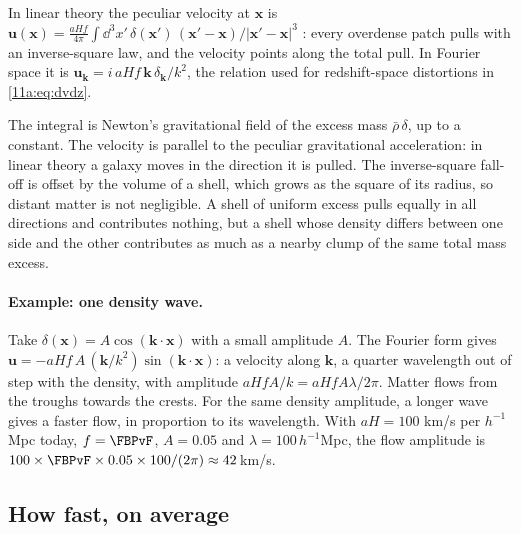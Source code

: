 \begin{keyidea}
In linear theory the peculiar velocity at $\bm x$ is
$\bm u(\bm x)=\frac{aHf}{4\pi}\int\dd^3x'\,\delta(\bm x')\,(\bm x'-\bm x)/|\bm x'-\bm x|^3$
\cite{Kaiser1987,Peebles1993}: every overdense patch pulls with an inverse-square
law, and the velocity points along the total pull. In Fourier space it is
$\bm u_{\bm k}=i\,aHf\,\bm k\,\delta_{\bm k}/k^2$, the relation used for redshift-space
distortions in \eqref{11a:eq:dvdz}.
\end{keyidea}

The integral is Newton's gravitational field of the excess mass $\bar\rho\,\delta$,
up to a constant. The velocity is parallel to the peculiar gravitational
acceleration: in linear theory a galaxy moves in the direction it is pulled. The
inverse-square fall-off is offset by the volume of a shell, which grows as the
square of its radius, so distant matter is not negligible. A shell of uniform
excess pulls equally in all directions and contributes nothing, but a shell whose
density differs between one side and the other contributes as much as a nearby
clump of the same total mass excess.

\paragraph{Example: one density wave.} Take $\delta(\bm x)=A\cos(\bm k\cdot\bm x)$
with a small amplitude $A$. The Fourier form gives
$\bm u=-aHf\,A\,(\bm k/k^2)\sin(\bm k\cdot\bm x)$: a velocity along $\bm k$, a quarter
wavelength out of step with the density, with amplitude $aHfA/k=aHfA\lambda/2\pi$.
Matter flows from the troughs towards the crests. For the same density amplitude,
a longer wave gives a faster flow, in proportion to its wavelength. With $aH=100$
km/s per $h^{-1}$Mpc today, $f=\FBPvF$, $A=0.05$ and $\lambda=100\,h^{-1}$Mpc, the
flow amplitude is $100\times\FBPvF\times0.05\times100/(2\pi)\approx42$\,km/s.

\subsection{How fast, on average}
\label{11c:sec:pv-sigma}

